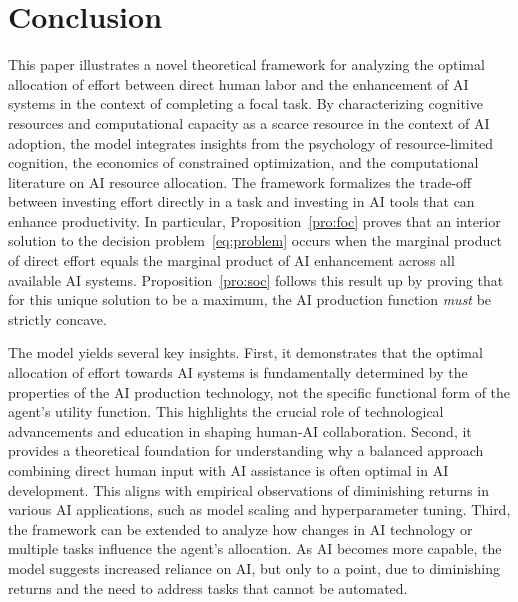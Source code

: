 \section{Conclusion}
\label{sec:con}
This paper illustrates a novel theoretical framework for analyzing the optimal allocation of effort between direct human labor and the enhancement of AI systems in the context of completing a focal task. By characterizing cognitive resources and computational capacity as a scarce resource in the context of AI adoption, the model integrates insights from the psychology of resource-limited cognition, the economics of constrained optimization, and the computational literature on AI resource allocation. The framework formalizes the trade-off between investing effort directly in a task and investing in AI tools that can enhance productivity. In particular, Proposition~\ref{pro:foc} proves that an interior solution to the decision problem~\ref{eq:problem} occurs when the marginal product of direct effort equals the marginal product of AI enhancement across all available AI systems. Proposition~\ref{pro:soc} follows this result up by proving that for this unique solution to be a maximum, the AI production function \textit{must} be strictly concave.

The model yields several key insights. First, it demonstrates that the optimal allocation of effort towards AI systems is fundamentally determined by the properties of the AI production technology, not the specific functional form of the agent’s utility function. This highlights the crucial role of technological advancements and education in shaping human-AI collaboration. Second, it provides a theoretical foundation for understanding why a balanced approach combining direct human input with AI assistance is often optimal in AI development. This aligns with empirical observations of diminishing returns in various AI applications, such as model scaling and hyperparameter tuning. Third, the framework can be extended to analyze how changes in AI technology or multiple tasks influence the agent’s allocation. As AI becomes more capable, the model suggests increased reliance on AI, but only to a point, due to diminishing returns and the need to address tasks that cannot be automated.

